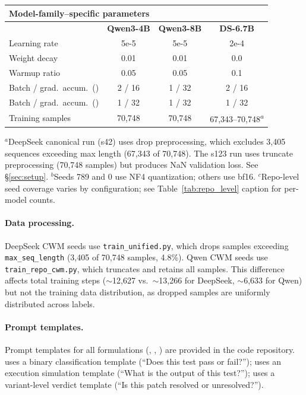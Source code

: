 \begin{table}[h]
\begin{tabular}{lccc}
\toprule
\multicolumn{4}{l}{\textbf{Model-family--specific parameters}} \\
\midrule
& \textbf{Qwen3-4B} & \textbf{Qwen3-8B} & \textbf{DS-6.7B} \\
\midrule
Learning rate & 5e-5 & 5e-5 & 2e-4 \\
Weight decay & 0.01 & 0.01 & 0.0 \\
Warmup ratio & 0.05 & 0.05 & 0.1 \\
Batch / grad.\ accum.\ (\cls{}) & 2 / 16 & 1 / 32 & 2 / 16 \\
Batch / grad.\ accum.\ (\cwm{}) & 1 / 32 & 1 / 32 & 1 / 32 \\
Training samples & 70,748 & 70,748 & 67,343--70,748\textsuperscript{$a$} \\
\bottomrule
\end{tabular}

\vspace{2pt}
{\footnotesize $^a$DeepSeek \cls{} canonical run (s42) uses drop preprocessing, which excludes 3,405 sequences exceeding max length (67,343 of 70,748). The s123 run uses truncate preprocessing (70,748 samples) but produces NaN validation loss. See \S\ref{sec:setup}. $^b$Seeds 789 and 0 use NF4 quantization; others use bf16. $^c$Repo-level seed coverage varies by configuration; see Table~\ref{tab:repo_level} caption for per-model counts.}
\end{table}

\paragraph{Data processing.} DeepSeek CWM seeds use \texttt{train\_unified.py}, which drops samples exceeding \texttt{max\_seq\_length} (3{,}405 of 70{,}748 samples, 4.8\%). Qwen CWM seeds use \texttt{train\_repo\_cwm.py}, which truncates and retains all samples. This difference affects total training steps (${\sim}$12{,}627 vs.\ ${\sim}$13{,}266 for DeepSeek, ${\sim}$6{,}633 for Qwen) but not the training data distribution, as dropped samples are uniformly distributed across labels.

\paragraph{Prompt templates.} Prompt templates for all formulations (\cls{}, \cwm{}, \traj{}) are provided in the code repository. \cls{} uses a binary classification template (``Does this test pass or fail?''); \cwm{} uses an execution simulation template (``What is the output of this test?''); \traj{} uses a variant-level verdict template (``Is this patch resolved or unresolved?'').


